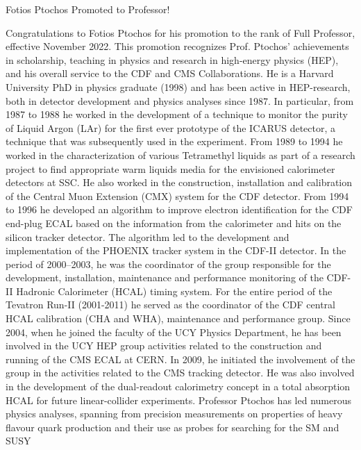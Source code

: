 \begin{headline}[enhanced, tikz={rotate=0}]{Fotios Ptochos Promoted to Professor!}
  \begin{multicols}{2}
    Congratulations to Fotios Ptochos for his promotion to the rank of
    Full Professor, effective November 2022. This promotion recognizes
    Prof. Ptochos' achievements in scholarship, teaching in physics and research in
    high-energy physics (HEP), and his overall service to the CDF and CMS
    Collaborations. He is a Harvard University PhD in physics
    graduate (1998) and has been active in HEP-research, both in detector
    development and physics analyses since 1987. In particular, from 1987
    to 1988 he worked in the development of a technique to monitor the
    purity of Liquid Argon (LAr) for the first ever prototype of the
    ICARUS detector, a technique that was subsequently used in the
    experiment. From 1989 to 1994 he worked in the characterization of
    various Tetramethyl liquids as part of a research project to find
    appropriate warm liquids media for the envisioned calorimeter
    detectors at SSC. He also worked in the construction, installation and
    calibration of the Central Muon Extension (CMX) system for the CDF
    detector. From 1994 to 1996 he developed an algorithm to improve
    electron identification for the CDF end-plug ECAL based on the
    information from the calorimeter and hits on the silicon tracker
    detector. The algorithm led to the development and implementation of
    the PHOENIX tracker system in the CDF-II detector. 
    In the period of 2000–2003, he was the coordinator of the group
    responsible for the development, installation, maintenance and
    performance monitoring of the CDF-II Hadronic Calorimeter (HCAL)
    timing system. For the entire period of the Tevatron Run-II
    (2001-2011) he served as the coordinator of the CDF central HCAL
    calibration (CHA and WHA), maintenance and performance group. Since
    2004, when he joined the faculty of the UCY Physics Department, he has
    been involved in the UCY HEP group activities related to the
    construction and running of the CMS ECAL at CERN. In 2009, he
    initiated the involvement of the group in the activities related to
    the CMS tracking detector. He was also involved in the development of
    the dual-readout calorimetry concept in a total absorption HCAL for
    future linear-collider experiments. 
    Professor Ptochos has led numerous physics analyses, spanning
    from precision measurements on properties of heavy flavour quark
    production and their use as probes for searching for the SM and SUSY

\end{multicols}
\end{headline}
